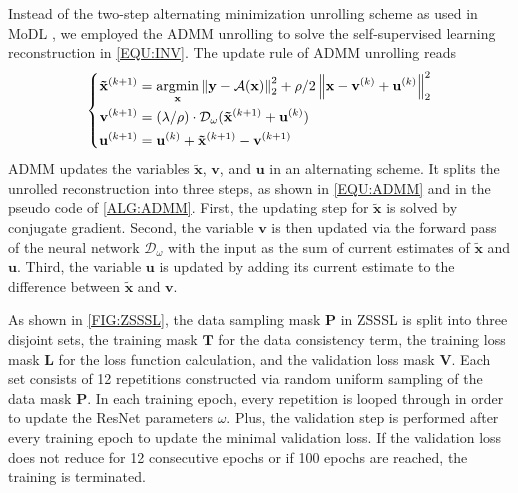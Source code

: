 \documentclass[journal,twoside,web]{ieeecolor}
\newcommand{\argmin}{\operatornamewithlimits{argmin}}
\newcommand{\norm}[1]{\left\lVert#1\right\rVert}
\begin{document}
	Instead of the two-step alternating minimization unrolling scheme as used in MoDL
	\cite{aggarwal_2018_modl},
	we employed the ADMM unrolling
	to solve the self-supervised learning reconstruction
	in \cref{EQU:INV}. The update rule of ADMM unrolling reads
	\begin{equation} \label{EQU:ADMM}
		\left\{\begin{aligned}
			\mathbf{\tilde{x}}^{(k+1)} &= \argmin_{\mathbf{x}} \norm{\mathbf{y} - \mathcal{A}(\mathbf{x})}_2^2 + \rho/2 \norm{ \mathbf{x} - \mathbf{v}^{(k)} + \mathbf{u}^{(k)}}_2^2 \\
			\mathbf{v}^{(k+1)} &= (\lambda/\rho) \cdot \mathcal{D}_{\omega} (\mathbf{\tilde{x}}^{(k+1)} + \mathbf{u}^{(k)}) \\
			\mathbf{u}^{(k+1)} &= \mathbf{u}^{(k)} + \mathbf{\tilde{x}}^{(k+1)} - \mathbf{v}^{(k+1)}
		\end{aligned}\right.
	\end{equation}
	ADMM updates the variables $\mathbf{\tilde{x}}$, $\mathbf{v}$,
	and $\mathbf{u}$ in an alternating scheme.
	It splits the unrolled reconstruction into three steps,
	as shown in \cref{EQU:ADMM} and in the pseudo code of \cref{ALG:ADMM}.
	First, the updating step for $\mathbf{\tilde{x}}$ is solved by conjugate gradient.
	Second, the variable $\mathbf{v}$ is then updated
	via the forward pass of the neural network $\mathcal{D}_{\omega}$
	with the input as the sum of current estimates
	of $\mathbf{\tilde{x}}$ and $\mathbf{u}$.
	Third, the variable $\mathbf{u}$ is updated
	by adding its current estimate to the difference
	between $\mathbf{\tilde{x}}$ and $\mathbf{v}$.

	As shown in \cref{FIG:ZSSSL}, the data sampling mask $\mathbf{P}$
	in ZSSSL \cite{yaman_2022_zs} is split into
	three disjoint sets, the training mask $\mathbf{T}$ for the data consistency term,
	the training loss mask $\mathbf{L}$ for the loss function calculation,
	and the validation loss mask $\mathbf{V}$.
	Each set consists of 12 repetitions constructed via random uniform sampling
	of the data mask $\mathbf{P}$.
	In each training epoch, every repetition is looped through
	in order to update the ResNet parameters $\omega$.
	Plus, the validation step is performed after every training epoch
	to update the minimal validation loss.
	If the validation loss does not reduce for 12 consecutive epochs or
	if 100 epochs are reached, the training is terminated.
\end{document}
